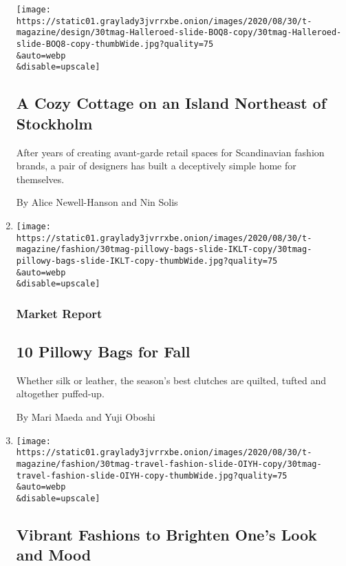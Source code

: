 \begin{enumerate}
  \texttt{[image: https://static01.graylady3jvrrxbe.onion/images/2020/08/30/t-magazine/design/30tmag-Halleroed-slide-BOQ8-copy/30tmag-Halleroed-slide-BOQ8-copy-thumbWide.jpg?quality=75\\\&auto=webp\\\&disable=upscale]}

  \hypertarget{a-cozy-cottage-on-an-island-northeast-of-stockholm}{%
  \subsection{A Cozy Cottage on an Island Northeast of
  Stockholm}\label{a-cozy-cottage-on-an-island-northeast-of-stockholm}}

  After years of creating avant-garde retail spaces for Scandinavian
  fashion brands, a pair of designers has built a deceptively simple
  home for themselves.

  By Alice Newell-Hanson and Nin Solis
\item
  \href{/2020/08/25/t-magazine/fall-bags-pillowy-clutches-accessories.html}{}

  \texttt{[image: https://static01.graylady3jvrrxbe.onion/images/2020/08/30/t-magazine/fashion/30tmag-pillowy-bags-slide-IKLT-copy/30tmag-pillowy-bags-slide-IKLT-copy-thumbWide.jpg?quality=75\\\&auto=webp\\\&disable=upscale]}

  \hypertarget{market-report}{%
  \subsubsection{Market Report}\label{market-report}}

  \hypertarget{10-pillowy-bags-for-fall}{%
  \subsection{10 Pillowy Bags for Fall}\label{10-pillowy-bags-for-fall}}

  Whether silk or leather, the season's best clutches are quilted,
  tufted and altogether puffed-up.

  By Mari Maeda and Yuji Oboshi
\item
  \href{/2020/08/24/t-magazine/fall-womens-fashion-bright-patterns.html}{}

  \texttt{[image: https://static01.graylady3jvrrxbe.onion/images/2020/08/30/t-magazine/fashion/30tmag-travel-fashion-slide-OIYH-copy/30tmag-travel-fashion-slide-OIYH-copy-thumbWide.jpg?quality=75\\\&auto=webp\\\&disable=upscale]}

  \hypertarget{vibrant-fashions-to-brighten-ones-look-and-mood}{%
  \subsection{Vibrant Fashions to Brighten One's Look and
  Mood}\label{vibrant-fashions-to-brighten-ones-look-and-mood}}


\end{enumerate}
